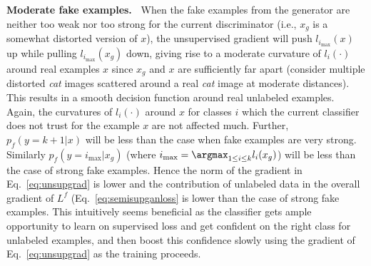 \documentclass{article}
\begin{document}
{\bf Moderate fake examples.~} When the fake examples from the generator are neither too weak nor too strong for the current discriminator (i.e., $x_g$ is a somewhat distorted version of $x$), the unsupervised gradient will push $l_{i_\text{max}}(x)$ up while pulling $l_{i_\text{max}}(x_g)$ down, giving rise to a moderate curvature of $l_i(\cdot)$ around real examples $x$ since $x_g$ and $x$ are sufficiently far apart (consider multiple distorted \emph{cat} images scattered around a real \emph{cat} image at moderate distances). This results in a smooth decision function around real unlabeled examples. Again, the curvatures of $l_i(\cdot)$ around $x$ for classes $i$ which the current classifier does not trust for the example $x$ are not affected much. 
Further, $p_f(y=k+1|x)$ will be less than the case when fake examples are very strong. Similarly $p_f(y=i_\text{max}|x_g)$ (where $i_\text{max}= \argmax_{1\leq i\leq k} l_i(x_g)$) will be less than the case of strong fake examples. Hence the norm of the gradient in Eq.~\eqref{eq:unsupgrad} is lower and the contribution of unlabeled data in the overall gradient of $L^f$ (Eq.~\eqref{eq:semisupganloss} is lower than the case of strong fake examples. This intuitively seems beneficial as the classifier gets ample opportunity to learn on supervised loss and get confident on the right class for unlabeled examples, and then boost this confidence slowly using the gradient of Eq.~\eqref{eq:unsupgrad} as the training proceeds.
\end{document}
